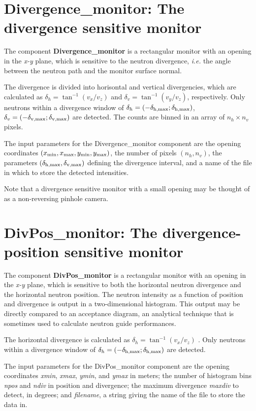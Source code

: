 \section{Divergence\_monitor: The divergence sensitive monitor}

The component {\bf Divergence\_monitor} is a rectangular monitor
with an opening in the \textit{x-y} plane,
which is sensitive to the neutron divergence, {\em i.e.} the angle
between the neutron path and the monitor surface normal.

The divergence is divided into horisontal and vertical divergencies,
which are calculated as $\delta_h = \tan^{-1}(v_x/v_z)$
and $\delta_v = \tan^{-1}(v_y/v_z)$, respectively.
Only neutrons within a divergence window of
$\delta_h = (-\delta_{\rm h,max} ; \delta_{\rm h,max})$,
$\delta_v = (-\delta_{\rm v,max} ; \delta_{\rm v,max})$
are detected. The counts are binned in an array of $n_h \times n_v$ pixels.

The input parameters for the Divergence\_monitor component are the opening coordinates
$(x_{\rm min}, x_{\rm max}, y_{\rm min}, y_{\rm max})$,
the number of pixels $(n_h, n_v)$,
the parameters $(\delta_{\rm h,max}, \delta_{\rm v,max})$
defining the divergence interval,
and a name of the file in which to store the detected intensities.

Note that a divergence sensitive monitor with a small opening may be
thought of as a non-reversing pinhole camera.


\section{DivPos\_monitor: The divergence-position sensitive monitor}

The component {\bf DivPos\_monitor} is a rectangular monitor with an
opening in the \textit{x-y} plane, which is sensitive to both the
horizontal neutron divergence and the horizontal neutron position. The
neutron intensity as a function of position and divergence is output in
a two-dimensional histogram. This output may be directly compared to an
acceptance diagram, an analytical technique that is sometimes used to
calculate neutron guide performances.

The horizontal divergence is calculated as $\delta_h = \tan^{-1}(v_x/v_z)$ .
Only neutrons within a divergence window of
$\delta_h = (-\delta_{\rm h,max} ; \delta_{\rm h,max})$ are detected.

The input parameters for the DivPos\_monitor component are the opening coordinates
\textit{xmin}, \textit{xmax}, \textit{ymin}, and
\textit{ymax} in meters;
the number of histogram bins \textit{npos} and \textit{ndiv} in
position and divergence; the maximum divergence \textit{maxdiv} to
detect, in degrees; and \textit{filename}, a
string giving the name of the file to store the data in.


